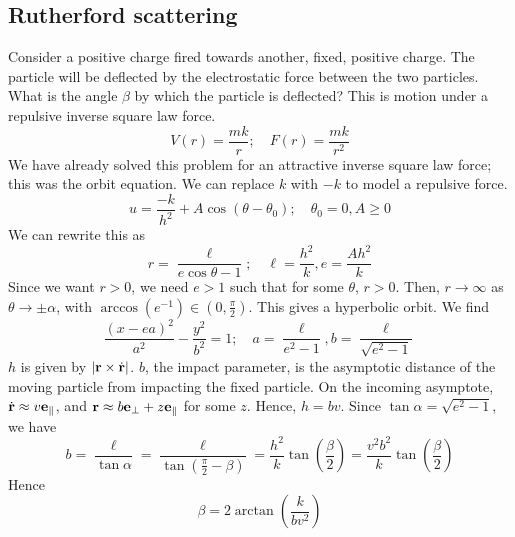 \subsection{Rutherford scattering}
Consider a positive charge fired towards another, fixed, positive charge.
The particle will be deflected by the electrostatic force between the two particles.
What is the angle \(\beta\) by which the particle is deflected?
This is motion under a repulsive inverse square law force.
\[
	V(r) = \frac{mk}{r};\quad F(r) = \frac{mk}{r^2}
\]
We have already solved this problem for an attractive inverse square law force; this was the orbit equation.
We can replace \(k\) with \(-k\) to model a repulsive force.
\[
	u = \frac{-k}{h^2} + A\cos(\theta - \theta_0);\quad \theta_0 = 0, A \geq 0
\]
We can rewrite this as
\[
	r = \frac{\ell}{e\cos\theta - 1};\quad \ell = \frac{h^2}{k}, e = \frac{Ah^2}{k}
\]
Since we want \(r > 0\), we need \(e > 1\) such that for some \(\theta\), \(r > 0\).
Then, \(r \to \infty\) as \(\theta \to \pm \alpha\), with \(\arccos(e^{-1}) \in \left(0, \frac{\pi}{2}\right)\).
This gives a hyperbolic orbit.
We find
\[
	\frac{(x - ea)^2}{a^2} - \frac{y^2}{b^2} = 1;\quad a = \frac{\ell}{e^2 - 1}, b = \frac{\ell}{\sqrt{e^2 - 1}}
\]
\(h\) is given by \(\abs{\vb r \times \dot{\vb r}}\).
\(b\), the impact parameter, is the asymptotic distance of the moving particle from impacting the fixed particle.
On the incoming asymptote, \(\dot {\vb r} \approx v\vb e_\parallel\), and \(\vb r \approx b\vb e_\perp + z\vb e_\parallel\) for some \(z\).
Hence, \(h=bv\).
Since \(\tan \alpha = \sqrt{e^2 - 1}\), we have
\[
	b = \frac{\ell}{\tan \alpha} = \frac{\ell}{\tan\left( \frac{\pi}{2} - \beta \right)} = \frac{h^2}{k}\tan\left( \frac{\beta}{2} \right) = \frac{v^2b^2}{k}\tan\left( \frac{\beta}{2} \right)
\]
Hence
\[
	\beta = 2\arctan\left( \frac{k}{bv^2} \right)
\]

